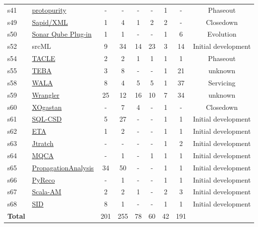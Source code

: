 \begin{table*}[htb]
\begin{tabular}{| l l | c c | c c c | c | c |}
s41 &
  \href{https://github.com/jensnicolay/jipda/tree/scam2015/protopurity}{protopurity} &
  - &
  - &
  - &
  - &
  1 &
  - &
  Phaseout \\
s49 &
  \href{http://www.jtool.org}{Sapid/XML} &
  1 &
  4 &
  1 &
  2 &
  2 &
  - &
  Closedown \\
s50 &
  \href{http://github.com/FrontEndART/SonarQube-plug-in}{Sonar Qube Plug-in} &
  1 &
  1 &
  - &
  - &
  1 &
  6 &
  Evolution \\
s52 &
  srcML &
  9 &
  34 &
  14 &
  23 &
  3 &
  14 &
  Initial development \\
s54 &
  \href{http://presto.cse.ohio-state.edu/tacle}{TACLE} &
  2 &
  2 &
  1 &
  1 &
  1 &
  1 &
  Phaseout \\
s55 &
  \href{http://tebasaki.jp/src}{TEBA} &
  3 &
  8 &
  - &
  - &
  1 &
  21 &
  unknown \\
s58 &
  \href{http://wala.sourceforge.net/wiki/index.php/Main_Page}{WALA} &
  8 &
  4 &
  5 &
  5 &
  1 &
  37 &
  Servicing \\
s59 &
  \href{http://www.cs.kent.ac.uk/projects/wrangler/Home.html}{Wrangler} &
  25 &
  12 &
  16 &
  10 &
  7 &
  34 &
  unknown \\
s60 &
  \href{http://web.ing.unisannio.it/villano/students/masone}{XOgastan} &
  - &
  7 &
  4 &
  - &
  1 &
  - &
  Closedown \\
s61 &
  \href{http://perso.unamur.be/~cnagy/scam2017-eng}{SQL-CSD} &
  5 &
  27 &
  - &
  - &
  1 &
  1 &
  Initial development \\
s62 &
  \href{https://github.com/rtse-project/extracting-time-automata}{ETA} &
  1 &
  2 &
  - &
  - &
  1 &
  1 &
  Initial development \\
s63 &
  \href{https://github.com/guipadua/JTratch}{Jtratch} &
  - &
  - &
  - &
  - &
  1 &
  2 &
  Initial development \\
s64 &
  \href{https://github.com/ecu-pase-lab/mysql-query-construction-analysis}{MQCA} &
  - &
  1 &
  - &
  1 &
  1 &
  1 &
  Initial development \\
s65 &
  \href{https://github.com/v-m/PropagationAnalysis}{PropagationAnalysis} &
  34 &
  50 &
  - &
  - &
  1 &
  1 &
  Initial development \\
s66 &
  \href{https://github.com/Mondego/pyreco}{PyReco} &
  - &
  1 &
  - &
  - &
  1 &
  1 &
  Initial development \\
s67 &
  \href{https://github.com/acieroid/scala-am}{Scala-AM} &
  2 &
  2 &
  1 &
  - &
  2 &
  3 &
  Initial development \\
s68 &
  \href{https://github.com/EnSoftCorp/SID}{SID} &
  8 &
  1 &
  - &
  - &
  1 &
  1 &
  Initial development \\
  \hline
{\bf Total} &
            &
  201 &
  255 &
  78 &
  60 &
  42 &
  191 &
     \\
  \hline
\end{tabular}
\label{dataset-table}
\end{table*}
